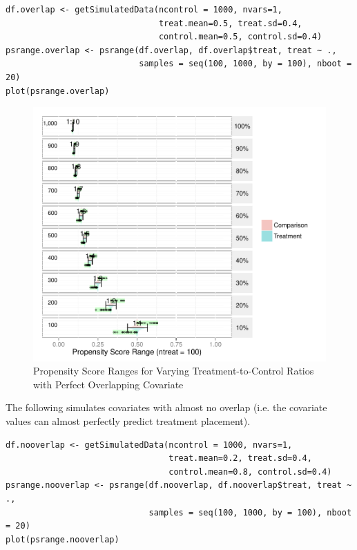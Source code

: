 \documentclass[letterpaper,12p,twoside]{article} %
\begin{document}
\begin{singlespace}
\begin{verbatim}
df.overlap <- getSimulatedData(ncontrol = 1000, nvars=1,
                               treat.mean=0.5, treat.sd=0.4,
                               control.mean=0.5, control.sd=0.4)
psrange.overlap <- psrange(df.overlap, df.overlap$treat, treat ~ ., 
                           samples = seq(100, 1000, by = 100), nboot = 20)
plot(psrange.overlap)
\end{verbatim}

\begin{figure}[h!]
\begin{center}
\includegraphics[width=\textwidth]{../Figures2009/PSRanges-Overlap.pdf}
\caption{Propensity Score Ranges for Varying Treatment-to-Control Ratios with Perfect Overlapping Covariate}
\end{center}
\end{figure}

\noindent The following simulates covariates with almost no overlap (i.e. the covariate values can almost perfectly predict treatment placement).

\begin{verbatim}
df.nooverlap <- getSimulatedData(ncontrol = 1000, nvars=1,
                                 treat.mean=0.2, treat.sd=0.4,
                                 control.mean=0.8, control.sd=0.4)
psrange.nooverlap <- psrange(df.nooverlap, df.nooverlap$treat, treat ~ ., 
                             samples = seq(100, 1000, by = 100), nboot = 20)
plot(psrange.nooverlap)
\end{verbatim}


\end{singlespace}
\end{document}
